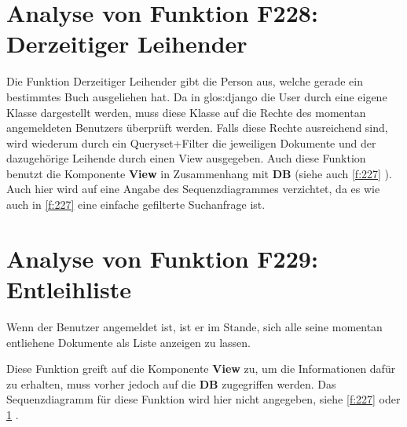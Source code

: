 \section{Analyse von Funktion F228: Derzeitiger Leihender}
\label{f:228}
Die Funktion Derzeitiger Leihender gibt die Person aus, welche gerade ein bestimmtes Buch ausgeliehen hat.
Da in \gls{glos:django} die User durch eine eigene Klasse dargestellt werden, muss diese Klasse auf die Rechte des momentan angemeldeten Benutzers überprüft werden. Falls diese Rechte ausreichend sind, wird wiederum durch ein Queryset+Filter die jeweiligen Dokumente und der dazugehörige Leihende durch einen View ausgegeben.
Auch diese Funktion benutzt die Komponente \textbf{View} in Zusammenhang mit \textbf{DB} (siehe auch \ref{f:227} ).
Auch hier wird auf eine Angabe des Sequenzdiagrammes verzichtet, da es wie auch in \ref{f:227}  eine einfache gefilterte Suchanfrage ist.



\section{Analyse von Funktion F229: Entleihliste}
Wenn der Benutzer angemeldet ist, ist er im Stande, sich alle seine momentan entliehene Dokumente als Liste anzeigen zu lassen.

Diese Funktion greift auf die Komponente \textbf{View} zu, um die Informationen dafür zu erhalten, muss vorher jedoch auf die \textbf{DB} zugegriffen werden.
Das Sequenzdiagramm für diese Funktion wird hier nicht angegeben, siehe \ref{f:227}  oder \ref{f:228} .
